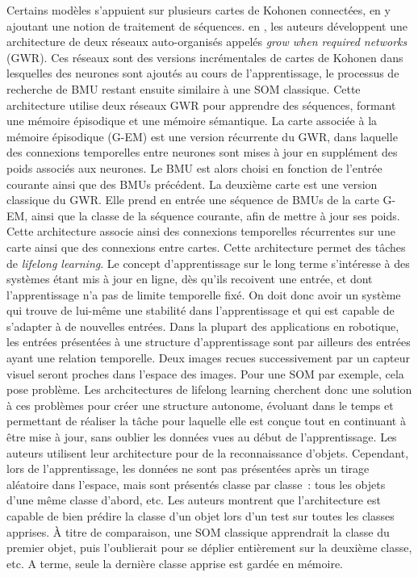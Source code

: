 \documentclass[../main]{subfiles}
\begin{document}
Certains modèles s'appuient sur plusieurs cartes de Kohonen connectées, en y ajoutant une notion de traitement de séquences.
en \cite{parisiLL}, les auteurs développent une architecture de deux réseaux auto-organisés appelés \emph{grow when required networks} (GWR). Ces réseaux sont des versions incrémentales de cartes de Kohonen dans lesquelles des neurones sont ajoutés au cours de l'apprentissage, le processus de recherche de BMU restant ensuite similaire à une SOM classique.
Cette architecture utilise deux réseaux GWR pour apprendre des séquences, formant une mémoire épisodique et une mémoire sémantique.
La carte associée à la mémoire épisodique (G-EM) est une version récurrente du GWR, dans laquelle des connexions temporelles entre neurones sont mises à jour en supplément des poids associés aux neurones. Le BMU est alors choisi en fonction de l'entrée courante ainsi que des BMUs précédent. 
La deuxième carte est une version classique du GWR. Elle prend en entrée une séquence de BMUs de la carte G-EM, ainsi que la classe de la séquence courante, afin de mettre à jour ses poids. 
Cette architecture associe ainsi des connexions temporelles récurrentes sur une carte ainsi que des connexions entre cartes.
Cette architecture permet des tâches de \emph{lifelong learning}. 
Le concept d'apprentissage sur le long terme s'intéresse à des systèmes étant mis à jour en ligne, dès qu'ils recoivent une entrée, et dont l'apprentissage n'a pas de limite temporelle fixé. On doit donc avoir un système qui trouve de lui-même une stabilité dans l'apprentissage et qui est capable de s'adapter à de nouvelles entrées.
Dans la plupart des applications en robotique, les entrées présentées à une structure d'apprentissage sont par ailleurs des entrées ayant une relation temporelle. Deux images recues successivement par un capteur visuel seront proches dans l'espace des images. Pour une SOM par exemple, cela pose problème. Les archcitectures de lifelong learning cherchent donc une solution à ces problèmes pour créer une structure autonome, évoluant dans le temps et permettant de réaliser la tâche pour laquelle elle est conçue tout en continuant à être mise à jour, sans oublier les données vues au début de l'apprentissage.
Les auteurs utilisent leur architecture pour de la reconnaissance d'objets. Cependant, lors de l'apprentissage, les données ne sont pas présentées après un tirage aléatoire dans l'espace, mais sont présentés classe par classe~: tous les objets d'une même classe d'abord, etc. Les auteurs montrent que l'architecture est capable de bien prédire la classe d'un objet lors d'un test sur toutes les classes apprises. \`{A} titre de comparaison, une SOM classique apprendrait la classe du premier objet, puis l'oublierait pour se déplier entièrement sur la deuxième classe, etc. A terme, seule la dernière classe apprise est gardée en mémoire.
\end{document}
